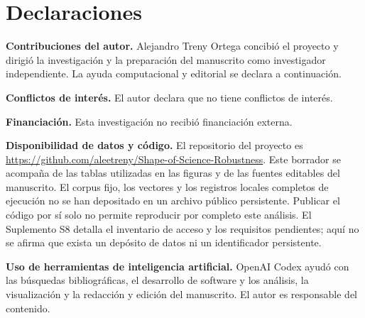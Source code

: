 \documentclass[12pt]{article}
\begin{document}
\section*{Declaraciones}
\textbf{Contribuciones del autor.}
Alejandro Treny Ortega concibió el proyecto y dirigió la investigación y la preparación del manuscrito como investigador independiente. La ayuda computacional y editorial se declara a continuación.
\par\medskip
\textbf{Conflictos de interés.}
El autor declara que no tiene conflictos de interés.
\par\medskip
\textbf{Financiación.}
Esta investigación no recibió financiación externa.
\par\medskip
\textbf{Disponibilidad de datos y código.}
El repositorio del proyecto es \url{https://github.com/aleetreny/Shape-of-Science-Robustness}. Este borrador se acompaña de las tablas utilizadas en las figuras y de las fuentes editables del manuscrito. El corpus fijo, los vectores y los registros locales completos de ejecución no se han depositado en un archivo público persistente. Publicar el código por sí solo no permite reproducir por completo este análisis. El Suplemento S8 detalla el inventario de acceso y los requisitos pendientes; aquí no se afirma que exista un depósito de datos ni un identificador persistente.
\par\medskip
\textbf{Uso de herramientas de inteligencia artificial.}
OpenAI Codex ayudó con las búsquedas bibliográficas, el desarrollo de software y los análisis, la visualización y la redacción y edición del manuscrito. El autor es responsable del contenido.



\end{document}
